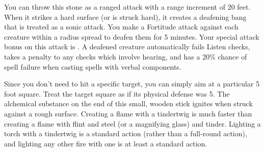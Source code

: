  You can throw this stone as a ranged attack with a range increment of 20 feet. When it strikes a hard surface (or is struck hard), it creates a deafening bang that is treated as a sonic attack. You make a Fortitude attack against each creature within a \areasmall radius spread to deafen them for 5 minutes. Your special attack bonus on this attack is . A deafened creature automatically fails Listen checks, takes a  penalty to any checks which involve hearing, and has a 20\% chance of spell failure when casting spells with verbal components.
\par Since you don't need to hit a specific target, you can simply aim at a particular 5 foot square. Treat the target square as if its physical defense was 5.
 The alchemical substance on the end of this small, wooden stick ignites when struck against a rough surface. Creating a flame with a tindertwig is much faster than creating a flame with flint and steel (or a magnifying glass) and tinder. Lighting a torch with a tindertwig is a standard action (rather than a full-round action), and lighting any other fire with one is at least a standard action.

